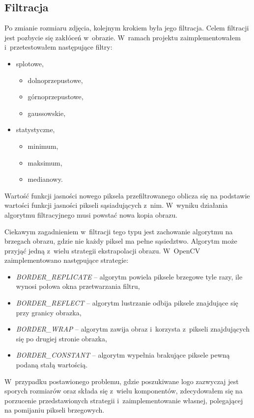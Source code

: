 \subsection{Filtracja}
Po zmianie rozmiaru zdjęcia, kolejnym krokiem była jego filtracja. Celem filtracji jest pozbycie się zakłóceń w~obrazie. W~ramach projektu zaimplementowałem i~przetestowałem następujące filtry:
\begin{itemize}
    \item splotowe,
    \begin{itemize}
        \item dolnoprzepustowe,
        \item górnoprzepustowe,
        \item gaussowskie,
    \end{itemize}
    \item statystyczne,
    \begin{itemize}
        \item minimum,
        \item maksimum,
        \item medianowy.
    \end{itemize}
\end{itemize}

Wartość funkcji jasności nowego piksela przefiltrowanego oblicza się na podstawie wartości funkcji jasności pikseli sąsiadujących z~nim. W~wyniku działania algorytmu filtracyjnego musi powstać nowa kopia obrazu. 

Ciekawym zagadnieniem w~filtracji tego typu jest zachowanie algorytmu na brzegach obrazu, gdzie nie każdy piksel ma pełne sąsiedztwo. Algorytm może przyjąć jedną z~wielu strategii ekstrapolacji obrazu. W~OpenCV~\cite{opencv} zaimplementowano następujące strategie:
\begin{itemize}
    \item \emph{BORDER\_{}REPLICATE} -- algorytm powiela piksele brzegowe tyle razy, ile wynosi połowa okna przetwarzania filtru,
    \item \emph{BORDER\_{}REFLECT} -- algorytm lustrzanie odbija piksele znajdujące się przy granicy obrazka,
    \item \emph{BORDER\_{}WRAP} -- algorytm zawija obraz i~korzysta z~pikseli znajdujących się po drugiej stronie obrazka,
    \item \emph{BORDER\_{}CONSTANT} -- algorytm wypełnia brakujące piksele pewną podaną stałą wartością.
\end{itemize}

W~przypadku postawionego problemu, gdzie poszukiwane logo zazwyczaj jest sporych rozmiarów oraz składa się z~wielu komponentów, zdecydowałem się na porzucenie przedstawionych strategii i~zaimplementowanie własnej, polegającej na pomijaniu pikseli brzegowych.

